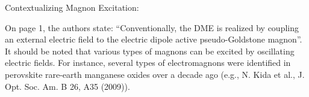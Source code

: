 Contextualizing Magnon Excitation:

On page 1, the authors state: ``Conventionally, the DME is realized by coupling an external electric field to the electric dipole active pseudo-Goldstone magnon''. It should be noted that various types of magnons can be excited by oscillating electric fields. For instance, several types of electromagnons were identified in perovskite rare-earth manganese oxides over a decade ago (e.g., N. Kida et al., J. Opt. Soc. Am. B 26, A35 (2009)).
